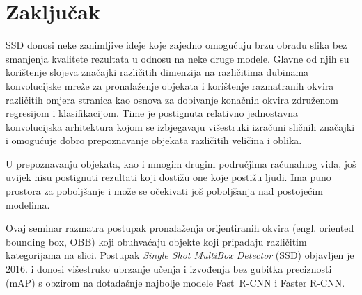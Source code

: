 \documentclass[utf8, diplomski, numeric, lmodern]{fer}
\begin{document}
\chapter{Zaključak} \label{chap:zakljucak}

SSD donosi neke zanimljive ideje koje zajedno omogućuju brzu obradu slika bez smanjenja kvalitete rezultata u odnosu na neke druge modele. Glavne od njih su korištenje slojeva značajki različitih dimenzija na različitima dubinama konvolucijske mreže za pronalaženje objekata i korištenje razmatranih okvira različitih omjera stranica kao osnova za dobivanje konačnih okvira združenom regresijom i klasifikacijom. Time je postignuta relativno jednostavna konvolucijska arhitektura kojom se izbjegavaju višestruki izračuni sličnih značajki i omogućuje dobro prepoznavanje objekata različitih veličina i oblika. 

U prepoznavanju objekata, kao i mnogim drugim područjima računalnog vida, još uvijek nisu postignuti rezultati koji dostižu one koje postižu ljudi. Ima puno prostora za poboljšanje i može se očekivati još poboljšanja nad postojećim modelima.

\begin{sazetak}
	Ovaj seminar razmatra postupak pronalaženja orijentiranih okvira (engl. oriented bounding box, OBB) koji obuhvaćaju objekte koji pripadaju različitim kategorijama na slici. Postupak \emph{Single Shot MultiBox Detector} (SSD) objavljen je $2016$. i donosi višestruko ubrzanje učenja i izvođenja bez gubitka preciznosti (mAP) s obzirom na dotadašnje najbolje modele Fast R-CNN i Faster R-CNN. 
	
\end{sazetak}




\end{document}
